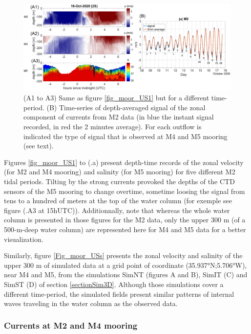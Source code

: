 \begin{figure}[!h]
 \includegraphics[width=\textwidth]{./GBR3D/US_moorings3.png}
 \caption {(A1 to A3) Same as figure \ref{fig_moor_US1} but for a different time-period. (B) Time-series of depth-averaged signal of the zonal component of currents from M2 data (in blue the instant signal recorded, in red the 2 minutes average). For each outflow is indicated the type of signal that is observed at M4 and M5 mooring (see text).}
 \label{fig_moor_US3}
\end{figure}

Figures \ref{fig_moor_US1} to (.a) present depth-time records of the zonal velocity (for M2 and M4 mooring) and salinity (for M5 mooring) for five different M2 tidal periods. Tilting by the strong currents provoked the depths of the CTD sensors of the M5 mooring to change overtime, sometime loosing the signal from tens to a hundred of meters at the top of the water column (for exemple see figure (.A3 at 15hUTC)). Additionnally, note that whereas the whole water column is presented in those figures for the M2 data, only the upper 300 m (of a 500-m-deep water column) are represented here for M4 and M5 data for a better visualization.

Similarly, figure \ref{Fig_moor_USs} presents the zonal velocity and salinity of the upper 300 m of simulated data at a grid point of coordinate (35.937°N;5.706°W), near M4 and M5, from the simulations SimNT (figures A and B), SimIT (C) and SimST (D) of section \ref{sectionSim3D}. Although those simulations cover a different time-period, the simulated fields present similar patterns of internal waves traveling in the water column as the observed data.


\subsubsection{Currents at M2 and M4 mooring}

